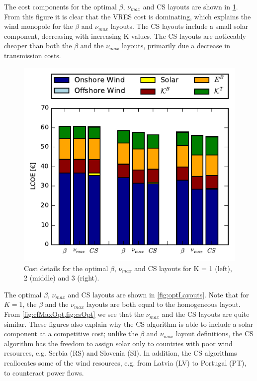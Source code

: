 \documentclass[a4paper, 5p, sort&compress]{elsarticle}%
\begin{document}
The cost components for the optimal $\beta$, $\nu_{max}$ and CS layouts are
shown in \cref{fig:cost}. From this figure it is clear that the VRES
cost is dominating, which explains the wind monopole for the $\beta$ and
$\nu_{max}$ layouts. The CS layouts include a small solar component,
decreasing with increasing K values. The CS layouts are noticeably
cheaper than both the $\beta$ and the $\nu_{max}$ layouts, primarily due a
decrease in transmission costs.

\begin{figure}[h!]
  \centering
  \includegraphics[width = \columnwidth]{costVE50}
  \caption{Cost details for the optimal $\beta$, $\nu_{max}$ and CS layouts
    for K = 1 (left), 2 (middle) and 3 (right).}
  \label{fig:cost}
\end{figure}

The optimal $\beta$, $\nu_{max}$ and CS layouts are shown in
\cref{fig:optLayouts}. Note that for $K=1$, the
$\beta$ and the $\nu_{max}$ layouts are both equal to the homogeneous
layout.  From \cref{fig:cfMaxOpt,fig:csOpt} we see that the $\nu_{max}$
and the CS layouts are quite similar. These figures also explain why
the CS algorithm is able to include a solar component at a competitive
cost; unlike the $\beta$ and $\nu_{max}$ layout definitions, the CS algorithm
has the freedom to assign solar only to countries with poor wind
resources, e.g. Serbia (RS) and Slovenia (SI). In addition, the CS
algorithms reallocates some of the wind resources, e.g. from Latvia
(LV) to Portugal (PT), to counteract power flows. %
\end{document}
